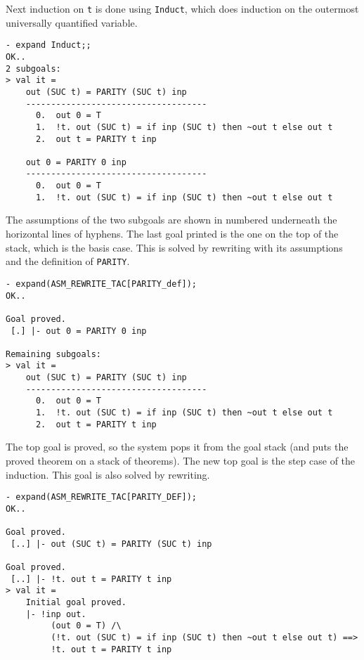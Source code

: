 \noindent Next induction on {\small\verb|t|} is done
using {\small\verb|Induct|}, which does
induction on the outermost universally quantified variable.

\begin{session}
\begin{verbatim}
- expand Induct;;
OK..
2 subgoals:
> val it =
    out (SUC t) = PARITY (SUC t) inp
    ------------------------------------
      0.  out 0 = T
      1.  !t. out (SUC t) = if inp (SUC t) then ~out t else out t
      2.  out t = PARITY t inp

    out 0 = PARITY 0 inp
    ------------------------------------
      0.  out 0 = T
      1.  !t. out (SUC t) = if inp (SUC t) then ~out t else out t
\end{verbatim}
\end{session}

\noindent The assumptions of the two subgoals
are shown in numbered underneath the horizontal lines of hyphens. The
last goal printed is the one on the top of the stack, which is the
basis case. This is solved by rewriting with its assumptions and the
definition of {\small\verb|PARITY|}.


\begin{session}
\begin{verbatim}
- expand(ASM_REWRITE_TAC[PARITY_def]);
OK..

Goal proved.
 [.] |- out 0 = PARITY 0 inp

Remaining subgoals:
> val it =
    out (SUC t) = PARITY (SUC t) inp
    ------------------------------------
      0.  out 0 = T
      1.  !t. out (SUC t) = if inp (SUC t) then ~out t else out t
      2.  out t = PARITY t inp
\end{verbatim}
\end{session}

The top goal is proved, so the system pops it from the goal stack (and
puts the proved theorem on a stack of theorems). The new top goal is
the step case of the induction. This goal is also solved by rewriting.

\begin{session}
\begin{verbatim}
- expand(ASM_REWRITE_TAC[PARITY_DEF]);
OK..

Goal proved.
 [..] |- out (SUC t) = PARITY (SUC t) inp

Goal proved.
 [..] |- !t. out t = PARITY t inp
> val it =
    Initial goal proved.
    |- !inp out.
         (out 0 = T) /\
         (!t. out (SUC t) = if inp (SUC t) then ~out t else out t) ==>
         !t. out t = PARITY t inp
\end{verbatim}
\end{session}

